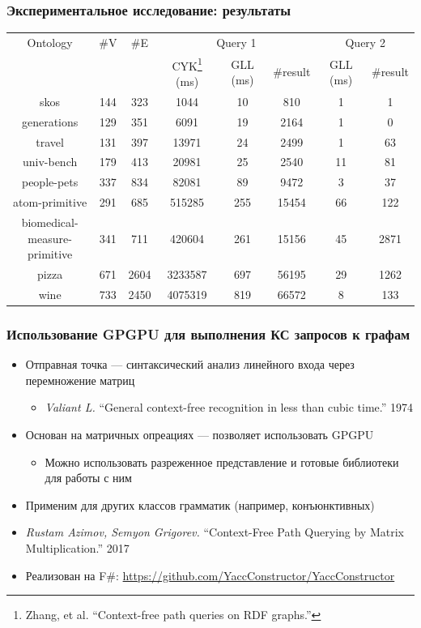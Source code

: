 \documentclass[xcolor=table,aspectratio=169]{beamer}
\begin{document}
\begin{frame}[fragile]
\transwipe[direction=90]
\frametitle{Экспериментальное исследование: результаты}
\centering
{}
\begin{tabular}{  c | c | c | c | c | c | c | c }
Ontology & \#V & \#E & \multicolumn{3}{c|}{Query 1} & \multicolumn{2}{c}{Query 2} \\
\cline{4-8}
& & & CYK\footnote{Zhang, et al. ``Context-free path queries on RDF graphs.''} (ms) & GLL (ms) & \#result & GLL (ms) & \#result \\
\hline 
\hline
skos        & 144 & 323 & 1044  & 10 & 810 & 1 & 1 \\
generations & 129 & 351 & 6091  & 19 & 2164 & 1 & 0 \\
travel      & 131 & 397 & 13971 & 24 & 2499 & 1 & 63 \\
univ-bench  & 179 & 413 & 20981 & 25 & 2540 & 11 & 81 \\
people-pets & 337 & 834 & 82081 & 89 & 9472 & 3 & 37 \\
atom-primitive & 291 & 685 & 515285 & 255 & 15454 & 66 & 122 \\
\shortstack{biomedical- \\ measure-primitive} & 341 & 711 & 420604 & 261 & 15156 & 45 & 2871 \\
pizza       & 671 & 2604 & 3233587 & 697 & 56195 & 29 & 1262 \\
wine        & 733 & 2450 & 4075319 & 819 & 66572 & 8 & 133 \\
\end{tabular}

\end{frame}

\begin{frame}[fragile]
  \transwipe[direction=90]
  \frametitle{Использование GPGPU для выполнения КС запросов к графам}

\begin{itemize} 
\item Отправная точка --- синтаксический анализ линейного входа через перемножение матриц
\begin{itemize}     
  \item \emph{Valiant L.} ``General context-free recognition in less than cubic time.'' 1974
\end{itemize}
\item Основан на матричных опреациях --- позволяет использовать GPGPU
\begin{itemize}     
  \item Можно использовать разреженное представление и готовые библиотеки для работы с ним
\end{itemize}
\item Применим для других классов грамматик (например, конъюнктивных)
\item \emph{Rustam Azimov, Semyon Grigorev.} ``Context-Free Path Querying by Matrix Multiplication.'' 2017
\item Реализован на F\#: \url{https://github.com/YaccConstructor/YaccConstructor}
\end{itemize}
\end{frame}
\end{document}
